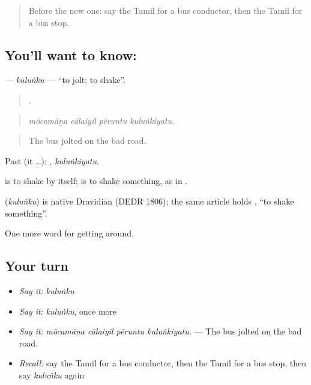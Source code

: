 \label{lesson:TA-C401-kulunku}



\begin{quote}
Before the new one: say the Tamil for a bus conductor, then the Tamil for a bus stop.
\end{quote}

\subsection*{You'll want to know: }
\textbf{} — \emph{kuluṅku} — \textquotedblleft{}to jolt; to shake\textquotedblright{}.

\begin{quote}
   .
\end{quote}

\begin{quote}
\emph{mōcamāṉa cālaiyil pēruntu kuluṅkiyatu.}
\end{quote}

\begin{quote}
The bus jolted on the bad road.
\end{quote}

Past (it …): , \emph{kuluṅkiyatu}.

 is to shake by itself;  is to shake something, as in  .

\begin{cousinweb}
\textbf{} (\emph{kuluṅku}) is native Dravidian (DEDR 1806); the same article holds , \textquotedblleft{}to shake something\textquotedblright{}.
\end{cousinweb}

\begin{grammarlens}[title={What you've built}]
One more word for getting around.
\end{grammarlens}

\subsection*{Your turn}
\begin{itemize}
\raggedright
  \item \emph{Say it:} \emph{kuluṅku}
  \item \emph{Say it:} \emph{kuluṅku}, once more
  \item \emph{Say it:} \emph{mōcamāṉa cālaiyil pēruntu kuluṅkiyatu.} — The bus jolted on the bad road.
  \item \emph{Recall:} say the Tamil for a bus conductor, then the Tamil for a bus stop, then say \emph{kuluṅku} again
\end{itemize}


